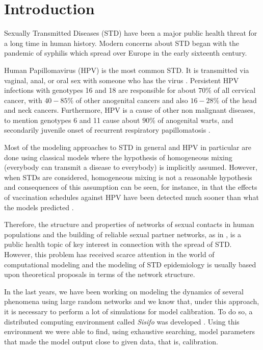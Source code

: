 
\chapter{Introduction}\label{CAPINTRO}

Sexually Transmitted Diseases (STD) have been a major public health threat for a long time in human history. Modern concerns about STD began with the pandemic of syphilis which spread over Europe in the early sixteenth century. 

Human Papillomavirus (HPV) is the most common STD. It is transmitted via vaginal, anal, or oral sex with someone who has the virus \cite{CDC_VPH}. Persistent HPV infections with genotypes 16 and 18 are responsible for about $70\%$ of all cervical cancer, with $40-85\%$ of other anogenital cancers and also $16-28\%$ of the head and neck cancers. Furthermore, HPV is a cause of other non malignant diseases, to mention genotypes 6 and 11 cause about $90\%$ of anogenital warts, and secondarily juvenile onset of recurrent respiratory papillomatosis \cite{castellsague2012prevalence}.

Most of the modeling approaches to STD in general and HPV in particular are done using classical models where the hypothesis of homogeneous mixing (everybody can transmit a disease to everybody) is implicitly assumed. However, when STDs are considered, homogeneous mixing is not a reasonable hypothesis and consequences of this assumption can be seen, for instance, in that the effects of vaccination schedules against HPV have been detected much sooner than what the models predicted \cite{fairley2009}.

Therefore, the structure and properties of networks of sexual contacts in human populations and the building of reliable sexual partner networks, as in \cite{NOVA_LSP}, is a public health topic of key interest in connection with the spread of STD. However, this problem has received scarce attention in the world of computational modeling and the modeling of STD epidemiology is usually based upon theoretical proposals in terms of the network structure. 

In the last years, we have been working on modeling the dynamics of several phenomena using large random networks \cite{acedo2011using,acedo2015firing,gonzalez2015modelling} and we know that, under this approach, it is necessary to perform a lot of simulations for model calibration. To do so, a distributed computing environment called \textit{Sisifo} \cite{wiki_sisifo} was developed \cite{villanueva2013epidemic}. Using this environment we were able to find, using exhaustive searching, model parameters that made the model output close to given data, that is, calibration. 

